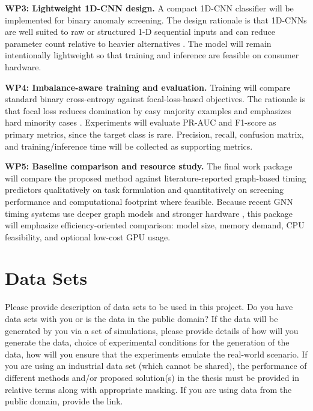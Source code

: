 \documentclass[12pt,a4paper]{article}
\begin{document}
\textbf{WP3: Lightweight 1D-CNN design.} A compact 1D-CNN classifier will be implemented for binary anomaly screening. The design rationale is that 1D-CNNs are well suited to raw or structured 1-D sequential inputs and can reduce parameter count relative to heavier alternatives \cite{Gong2022FastAnomaly}. The model will remain intentionally lightweight so that training and inference are feasible on consumer hardware.

\textbf{WP4: Imbalance-aware training and evaluation.} Training will compare standard binary cross-entropy against focal-loss-based objectives. The rationale is that focal loss reduces domination by easy majority examples and emphasizes hard minority cases \cite{Lin2017FocalLoss}. Experiments will evaluate PR-AUC and F1-score as primary metrics, since the target class is rare. Precision, recall, confusion matrix, and training/inference time will be collected as supporting metrics.

\textbf{WP5: Baseline comparison and resource study.} The final work package will compare the proposed method against literature-reported graph-based timing predictors qualitatively on task formulation and quantitatively on screening performance and computational footprint where feasible. Because recent GNN timing systems use deeper graph models and stronger hardware \cite{Ding2024PTAGNN}, this package will emphasize efficiency-oriented comparison: model size, memory demand, CPU feasibility, and optional low-cost GPU usage.

\section{Data Sets}
Please provide description of data sets to be used in this project. Do you have data sets with you or is the data in the public domain? If the data will be generated by you via a set of simulations, please provide details of how will you generate the data, choice of experimental conditions for the generation of the data, how will you ensure that the experiments emulate the real-world scenario. If you are using an industrial data set (which cannot be shared), the performance of different methods and/or proposed solution(s) in the thesis must be provided in relative terms along with appropriate masking. If you are using data from the public domain, provide the link. 
\end{document}
